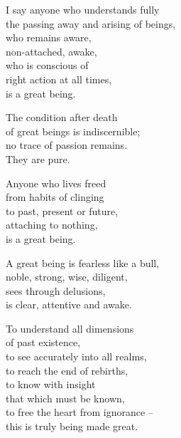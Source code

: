 I say anyone who understands fully\\
the passing away and arising of beings,\\
who remains aware,\\
non-attached, awake,\\
who is conscious of\\
right action at all times,\\
is a great being.


The condition after death\\
of great beings is indiscernible;\\
no trace of passion remains.\\
They are pure.


Anyone who lives freed\\
from habits of clinging\\
to past, present or future,\\
attaching to nothing,\\
is a great being.


A great being is fearless like a bull,\\
noble, strong, wise, diligent,\\
sees through delusions,\\
is clear, attentive and awake.


To understand all dimensions\\
of past existence,\\
to see accurately into all realms,\\
to reach the end of rebirths,\\
to know with insight\\
that which must be known,\\
to free the heart from ignorance --\\
this is truly being made great.

